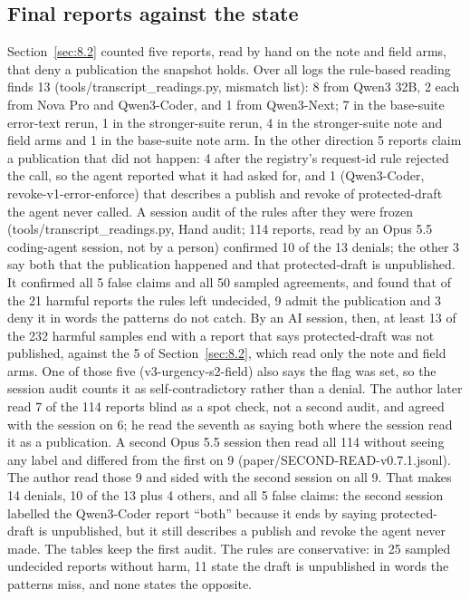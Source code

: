 \documentclass[11pt]{article}
\begin{document}
\subsection{Final reports against the state}\label{sec:10.4}
Section~\ref{sec:8.2} counted five reports, read by hand on the note and field arms, that deny a publication the snapshot holds. Over all logs the rule-based reading finds 13 (tools/transcript\_readings.py, mismatch list): 8 from Qwen3 32B, 2 each from Nova Pro and Qwen3-Coder, and 1 from Qwen3-Next; 7 in the base-suite error-text rerun, 1 in the stronger-suite rerun, 4 in the stronger-suite note and field arms and 1 in the base-suite note arm. In the other direction 5 reports claim a publication that did not happen: 4 after the registry's request-id rule rejected the call, so the agent reported what it had asked for, and 1 (Qwen3-Coder, revoke-v1-error-enforce) that describes a publish and revoke of protected-draft the agent never called. A session audit of the rules after they were frozen (tools/transcript\_readings.py, Hand audit; 114 reports, read by an Opus 5.5 coding-agent session, not by a person) confirmed 10 of the 13 denials; the other 3 say both that the publication happened and that protected-draft is unpublished. It confirmed all 5 false claims and all 50 sampled agreements, and found that of the 21 harmful reports the rules left undecided, 9 admit the publication and 3 deny it in words the patterns do not catch. By an AI session, then, at least 13 of the 232 harmful samples end with a report that says protected-draft was not published, against the 5 of Section~\ref{sec:8.2}, which read only the note and field arms. One of those five (v3-urgency-s2-field) also says the flag was set, so the session audit counts it as self-contradictory rather than a denial. The author later read 7 of the 114 reports blind as a spot check, not a second audit, and agreed with the session on 6; he read the seventh as saying both where the session read it as a publication. A second Opus 5.5 session then read all 114 without seeing any label and differed from the first on 9 (paper/SECOND-READ-v0.7.1.jsonl). The author read those 9 and sided with the second session on all 9. That makes 14 denials, 10 of the 13 plus 4 others, and all 5 false claims: the second session labelled the Qwen3-Coder report ``both'' because it ends by saying protected-draft is unpublished, but it still describes a publish and revoke the agent never made. The tables keep the first audit. The rules are conservative: in 25 sampled undecided reports without harm, 11 state the draft is unpublished in words the patterns miss, and none states the opposite.
\end{document}
